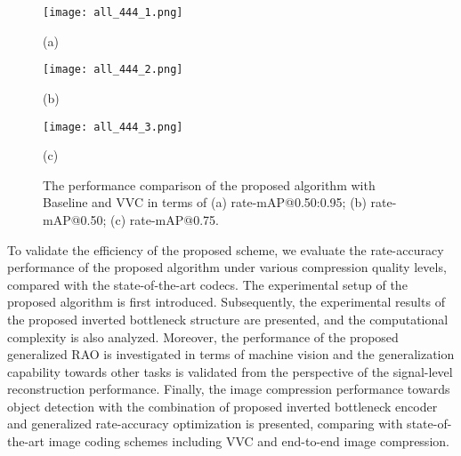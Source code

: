 \documentclass[transmag]{IEEEtran}
\begin{document}
\begin{figure*}[t]
\begin{minipage}[b]{0.3\linewidth}
  \centering
  \centerline{\texttt{[image: all\_444\_1.png]}}
  \centerline{(a)}\medskip
\end{minipage}
\hfill
\begin{minipage}[b]{0.3\linewidth}
  \centering
  \centerline{\texttt{[image: all\_444\_2.png]}}
  \centerline{(b)}\medskip
\end{minipage}
\hfill
\begin{minipage}[b]{0.3\linewidth}
  \centering
  \centerline{\texttt{[image: all\_444\_3.png]}}
  \centerline{(c)}\medskip
\end{minipage}
\vspace{-4mm}
\caption{The performance comparison of the proposed algorithm with Baseline and VVC in terms of (a) rate-mAP@0.50:0.95; (b) rate-mAP@0.50; (c) rate-mAP@0.75.}
\vspace{-2mm}
\label{all}
\end{figure*}

To validate the efficiency of the proposed scheme, we evaluate the rate-accuracy performance of the proposed algorithm under various compression quality levels, compared with the state-of-the-art codecs. The experimental setup of the proposed algorithm is first introduced. Subsequently, the experimental results of the proposed inverted bottleneck structure are presented, and the computational complexity is also 
analyzed. Moreover, the performance of the proposed generalized RAO is investigated in terms of machine vision and the generalization capability towards other tasks is validated from the perspective of the signal-level reconstruction performance. Finally, the image compression performance towards object detection with the combination of proposed inverted bottleneck encoder and generalized rate-accuracy optimization is presented, comparing with state-of-the-art image coding schemes including VVC and end-to-end image compression. 
\end{document}
